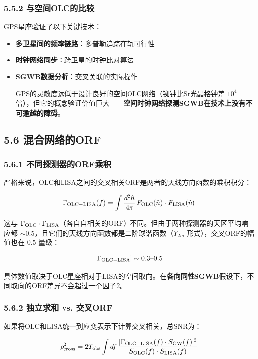 \documentclass[12pt,a4paper]{article}
\begin{document}
\subsubsection{5.5.2 与空间OLC的比较}


GPS星座验证了以下关键技术：
\begin{itemize}
  \item[1] \textbf{多卫星间的频率链路}：多普勒追踪在轨可行性
  \item[2] \textbf{时钟网络同步}：跨卫星的时钟比对算法
  \item[3] \textbf{SGWB数据分析}：交叉关联的实际操作

GPS的灵敏度远低于设计良好的空间OLC网络（铷钟比Sr光晶格钟差 $10^4$ 倍），但它的概念验证价值巨大——\textbf{空间时钟网络探测SGWB在技术上没有不可逾越的障碍}。

\end{itemize}
\subsection{5.6 混合网络的ORF}


\subsubsection{5.6.1 不同探测器的ORF乘积}


严格来说，OLC和LISA之间的交叉相关ORF是两者的天线方向函数的乘积积分：

$$\Gamma_{\rm OLC-LISA}(f) = \int \frac{d^2\hat{n}}{4\pi}\, F_{\rm OLC}(\hat{n}) \cdot F_{\rm LISA}(\hat{n})$$

这与 $\Gamma_{\rm OLC} \cdot \Gamma_{\rm LISA}$（各自自相关的ORF）不同。但由于两种探测器的天区平均响应都 $\sim 0.5$，且它们的天线方向函数都是二阶球谐函数（$Y_{2m}$ 形式），交叉ORF的幅值也在 $0.5$ 量级：

$$|\Gamma_{\rm OLC-LISA}| \sim 0.3\text{--}0.5$$

具体数值取决于OLC星座相对于LISA的空间取向。在\textbf{各向同性SGWB}假设下，不同取向的ORF差异不会超过一个因子2。

\subsubsection{5.6.2 独立求和 vs. 交叉ORF}


如果将OLC和LISA统一到应变表示下计算交叉相关，总SNR为：

$$\rho_{\rm cross}^2 = 2 T_{\rm obs} \int df\, \frac{|\Gamma_{\rm OLC-LISA}(f) \cdot S_{\rm GW}(f)|^2}{S_{\rm OLC}(f) \cdot S_{\rm LISA}(f)}$$
\end{document}
